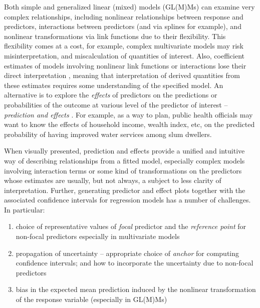 \documentclass[10pt,letterpaper]{article}
\begin{document}
Both simple and generalized linear (mixed) models (GL(M)Ms) can examine very complex relationships, including nonlinear relationships between response and predictors, interactions between predictors (and via splines for example), and nonlinear transformations via link functions due to their flexibility. This flexibility comes at a cost, for example, complex multivariate models may risk misinterpretation, and miscalculation of quantities of interest. Also, coefficient estimates of models involving nonlinear link functions or interactions lose their direct interpretation \cite{leeper2017interpreting}, meaning that interpretation of derived quantities from these estimates requires some understanding of the specified model. An alternative is to explore the \emph{effects} of predictors on the predictions or probabilities of the outcome at various level of the predictor of interest -- \emph{prediction and effects} \cite{fox2009effect, leeper2017package, lenth2018package}. For example, as a way to plan, public health officials may want to know the effects of household income, wealth index, etc, on the predicted probability of having improved water services among slum dwellers.


When visually presented, prediction and effects provide a unified and intuitive way of describing relationships from a fitted model, especially complex models involving interaction terms or some kind of transformations on the predictors whose estimates are usually, but not always, a subject to less clarity of interpretation. Further, generating predictor and effect plots together with the associated confidence intervals for regression models has a number of challenges. In particular:
\begin{enumerate}
\item choice of representative values of \emph{focal} predictor and the \emph{reference point} for non-focal predictors especially in multivariate models
\item  propagation of uncertainty -- appropriate choice of \emph{anchor} for computing confidence intervals; and how to incorporate the uncertainty due to non-focal predictors 
\item bias in the expected mean prediction induced by the nonlinear transformation of the response variable (especially in GL(M)Ms)
\end{enumerate}
\end{document}
